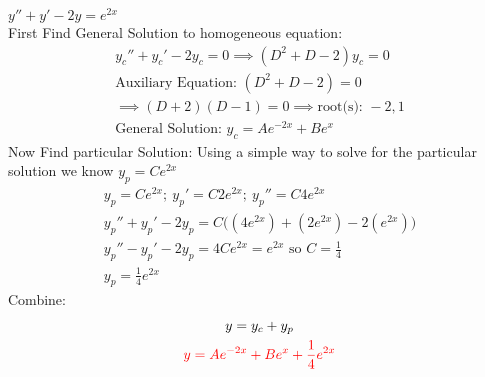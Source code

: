 \item [3.] $y''+y'-2y=e^{2x}$\\[2mm]
First Find General Solution to homogeneous equation:
\begin{gather*}
    y_c''+y_c'-2y_c=0 \implies (D^2+D-2)y_c=0\\
    \text{Auxiliary Equation: }(D^2+D-2)=0\\
    \implies (D+2)(D-1)=0 \implies \text{root(s): } -2,1\\
    \text{General Solution: } y_c=Ae^{-2x}+Be^{x}
\end{gather*}
Now Find particular Solution:
Using a simple way to solve for the particular solution we know $y_p=Ce^{2x}$
\begin{gather*}
    y_p=Ce^{2x};\:y_p'=C2e^{2x};\:y_p''=C4e^{2x}\\
    y_p''+y_p'-2y_p=C\big((4e^{2x})+(2e^{2x})-2(e^{2x})\big)\\
    y_p''-y_p'-2y_p=4Ce^{2x} = e^{2x} \text{ so } C=\frac{1}{4}\\
    y_p = \frac{1}{4}e^{2x}
\end{gather*}
Combine:
\begin{gather*}
    y=y_c+y_p\\
    \textcolor{red}{y = Ae^{-2x}+Be^{x}+\frac{1}{4}e^{2x}}
\end{gather*}